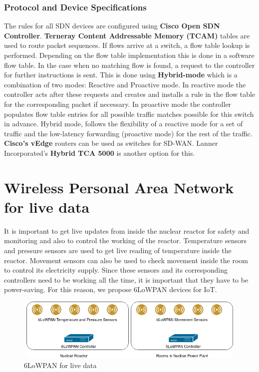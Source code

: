 \documentclass{article}
\begin{document}
\subsubsection{Protocol and Device Specifications}
The rules for all SDN devices are configured using \textbf{Cisco Open SDN Controller}. \textbf{Terneray Content Addressable Memory (TCAM)} tables are used to route packet sequences. If flows arrive at a switch, a flow table lookup is performed. Depending on the flow table implementation this is done in a software flow table. In the case when no matching flow is found, a request to the controller for further instructions is sent. This is done using \textbf{Hybrid-mode} which is a combination of two modes: Reactive and Proactive mode.  In reactive mode the controller acts after these requests and creates and installs a rule in the flow table for the corresponding packet if necessary. In proactive mode the controller populates flow table entries for all possible traffic matches possible for this switch in advance. Hybrid mode, follows the flexibility of a reactive mode for a set of traffic and the low-latency forwarding (proactive mode) for the rest of the traffic. \textbf{Cisco's vEdge} routers can be used as switches for SD-WAN. Lanner Incorporated's \textbf{Hybrid TCA 5000} is another option for this.
\section{Wireless Personal Area Network for live data}
It is important to get live updates from inside the nuclear reactor for safety and monitoring and also to control the working of the reactor. Temperature sensors and pressure sensors are used to get live reading of temperature inside the reactor. Movement sensors can also be used to check movement inside the room to control its electricity supply. Since these sensors and its corresponding controllers need to be working all the time, it is important that they have to be power-saving. For this reason, we propose 6LoWPAN devices for IoT.
\begin{figure}[htb]
	\centering
	\includegraphics[width=12cm,height=3cm]{wpan_design.png}
	\caption{6LoWPAN for live data}
\end{figure}
\end{document}
